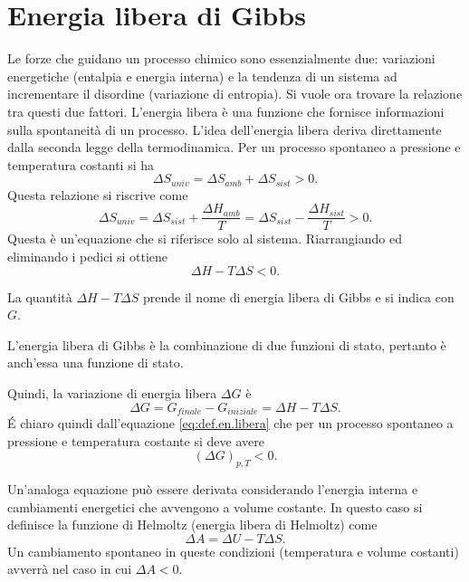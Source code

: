 \section{Energia libera di Gibbs}
Le forze che guidano un processo chimico sono essenzialmente due: variazioni energetiche (entalpia e energia interna) e la tendenza di un sistema ad incrementare il disordine (variazione di entropia). Si vuole ora trovare la relazione tra questi due fattori. L'energia libera è una funzione che fornisce informazioni sulla spontaneità di un processo. L'idea dell'energia libera deriva direttamente dalla seconda legge della termodinamica. Per un processo spontaneo a pressione e temperatura costanti si ha
\begin{equation}
    \Delta S_{univ}=\Delta S_{amb}+\Delta S_{sist}>0.
\end{equation}
Questa relazione si riscrive come
\begin{equation}
    \Delta S_{univ}=\Delta S_{sist}+\frac{\Delta H_{amb}}{T}=\Delta S_{sist}-\frac{\Delta H_{sist}}{T}>0.
\end{equation}
Questa è un'equazione che si riferisce solo al sistema. Riarrangiando ed eliminando i pedici si ottiene
\begin{equation}
    \Delta H-T\Delta S<0.
\end{equation}
\begin{defn}
    La quantità $\Delta H-T\Delta S$ prende il nome di energia libera di Gibbs e si indica con $G$.
\end{defn}
\begin{obs}
    L'energia libera di Gibbs è la combinazione di due funzioni di stato, pertanto è anch'essa una funzione di stato.
\end{obs}
Quindi, la variazione di energia libera $\Delta G$ è 
\begin{equation}\label{eq:def.en.libera}
    \Delta G=G_{finale}-G_{iniziale}=\Delta H-T\Delta S.
\end{equation}
\'E chiaro quindi dall'equazione \eqref{eq:def.en.libera} che per un processo spontaneo a pressione e temperatura costante si deve avere
\begin{equation}
    {\left(\Delta G\right)}_{p,T}<0.
\end{equation}
\begin{obs}
    Un'analoga equazione può essere derivata considerando l'energia interna e cambiamenti energetici che avvengono a volume costante. In questo caso si definisce la funzione di Helmoltz (energia libera di Helmoltz) come
    \begin{equation}
        \Delta A=\Delta U-T\Delta S.
    \end{equation}
     Un cambiamento spontaneo in queste condizioni (temperatura e volume costanti) avverrà nel caso in cui $\Delta A<0$.
\end{obs}
